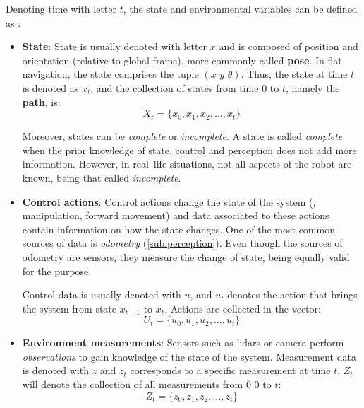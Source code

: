 Denoting time with letter $t$, the state and environmental variables can be defined as :
\begin{itemize}
  \item \textbf{State}: State is usually denoted with letter $x$ and is composed of position and orientation (relative to global frame), more commonly called \textbf{pose}. In flat navigation, the state comprises the tuple $(x\,\,y\,\,\theta)$. Thus, the state at time $t$ is denoted as $x_t$, and the collection of states from time $0$ to $t$, namely the \textbf{path}, is:
  \begin{equation}
    X_t = \{x_0, x_1, x_2,\ldots,x_t \}
    \label{eq:state}
  \end{equation} 

  Moreover, states can be \emph{complete} or \emph{incomplete}. A state is called \emph{complete} when the prior knowledge of state, control and perception does not add more information. However, in real--life situations, not all aspects of the robot are known, being that called \emph{incomplete}.

  \item \textbf{Control actions}: Control actions change the state of the system (\eg, manipulation, forward movement) and data associated to these actions contain information on how the state changes. One of the most common sources of data is \emph{odometry} (\autoref{sub:perception}). Even though the sources of odometry are sensors, they measure the change of state, being equally valid for the purpose.
  
  Control data is usually denoted with $u$, and $u_t$ denotes the action that brings the system from state $x_{t-1}$ to $x_t$. Actions are collected in the vector:
  \begin{equation}
    U_t = \{u_0, u_1, u_2,\ldots,u_t \}
    \label{eq:actions}
  \end{equation}   

  \item \textbf{Environment measurements}: Sensors such as lidars or camera perform \emph{observations} to gain knowledge of the state of the system. Measurement data is denoted with $z$ and $z_t$ corresponds to a specific measurement at time $t$. $Z_t$ will denote the collection of all measurements from $0$ 0 to $t$:
  \begin{equation}
    Z_t = \{z_0, z_1, z_2,\ldots,z_t \}
    \label{eq:env}
  \end{equation}  
\end{itemize}  

